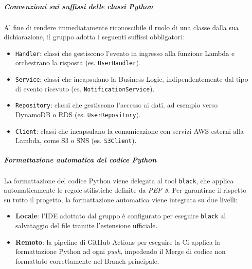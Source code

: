 \documentclass[a4paper,12pt]{article}
\begin{document}
\subparagraph{Convenzioni sui suffissi delle classi Python}
Al fine di rendere immediatamente riconoscibile il ruolo di una classe dalla sua dichiarazione, il gruppo adotta i seguenti suffissi obbligatori:
\begin{itemize}
    \item \texttt{Handler}: classi che gestiscono l'evento in ingresso alla funzione Lambda e orchestrano la risposta (es. \texttt{UserHandler}).
    \item \texttt{Service}: classi che incapsulano la Business Logic, indipendentemente dal tipo di evento ricevuto (es. \texttt{NotificationService}).
    \item \texttt{Repository}: classi che gestiscono l'accesso ai dati, ad esempio verso DynamoDB o RDS (es. \texttt{UserRepository}).
    \item \texttt{Client}: classi che incapsulano la comunicazione con servizi AWS esterni alla Lambda, come S3 o SNS (es. \texttt{S3Client}).
\end{itemize}

\subparagraph{Formattazione automatica del codice Python}
La formattazione del codice Python viene delegata al tool \texttt{black}, che applica automaticamente le regole stilistiche definite da \textit{PEP 8}.
Per garantirne il rispetto su tutto il progetto, la formattazione automatica viene integrata su due livelli:
\begin{itemize}
    \item \textbf{Locale}: l'IDE adottato dal gruppo è configurato per eseguire \texttt{black} al salvataggio del file tramite l'estensione ufficiale.
    \item \textbf{Remoto}: la pipeline di GitHub Actions per eseguire la Ci applica la formattazione Python ad ogni \textit{push}, impedendo il Merge di codice non formattato correttamente nel Branch principale.
\end{itemize}
\end{document}
